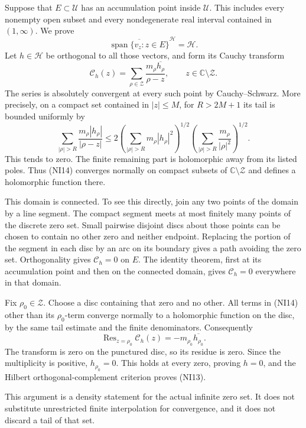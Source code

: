 \documentclass[
  10pt,
  a4paper,
]{article}
\begin{document}
Suppose that \(E\subset\mathcal U\) has an accumulation point inside
\(\mathcal U\). This includes every nonempty open subset and every
nondegenerate real interval contained in \((1,\infty)\). We prove \[
\overline{\operatorname{span}\{v_z:z\in E\}}^{\mathcal H}
=\mathcal H.
\tag{NI13}
\] Let \(h\in\mathcal H\) be orthogonal to all those vectors, and form
its Cauchy transform \[
\mathcal C_h(z)=\sum_{\rho\in\mathcal Z}
\frac{m_\rho\overline{h_\rho}}{\rho-z},
\qquad z\in\mathbb C\setminus\mathcal Z.
\tag{NI14}
\] The series is absolutely convergent at every such point by
Cauchy--Schwarz. More precisely, on a compact set contained in
\(|z|\le M\), for \(R>2M+1\) its tail is bounded uniformly by \[
\sum_{|\rho|>R}
\frac{m_\rho|h_\rho|}{|\rho-z|}
\le
2\left(\sum_{|\rho|>R}m_\rho|h_\rho|^2\right)^{1/2}
\left(\sum_{|\rho|>R}\frac{m_\rho}{|\rho|^2}\right)^{1/2}.
\tag{NI15}
\] This tends to zero. The finite remaining part is holomorphic away
from its listed poles. Thus (NI14) converges normally on compact subsets
of \(\mathbb C\setminus\mathcal Z\) and defines a holomorphic function
there.

This domain is connected. To see this directly, join any two points of
the domain by a line segment. The compact segment meets at most finitely
many points of the discrete zero set. Small pairwise disjoint discs
about those points can be chosen to contain no other zero and neither
endpoint. Replacing the portion of the segment in each disc by an arc on
its boundary gives a path avoiding the zero set. Orthogonality gives
\(\mathcal C_h=0\) on \(E\). The identity theorem, first at its
accumulation point and then on the connected domain, gives
\(\mathcal C_h=0\) everywhere in that domain.

Fix \(\rho_0\in\mathcal Z\). Choose a disc containing that zero and no
other. All terms in (NI14) other than its \(\rho_0\)-term converge
normally to a holomorphic function on the disc, by the same tail
estimate and the finite denominators. Consequently \[
\operatorname{Res}_{z=\rho_0}\mathcal C_h(z)
=-m_{\rho_0}\overline{h_{\rho_0}}.
\tag{NI16}
\] The transform is zero on the punctured disc, so its residue is zero.
Since the multiplicity is positive, \(h_{\rho_0}=0\). This holds at
every zero, proving \(h=0\), and the Hilbert orthogonal-complement
criterion proves (NI13).

This argument is a density statement for the actual infinite zero set.
It does not substitute unrestricted finite interpolation for
convergence, and it does not discard a tail of that set.
\end{document}
